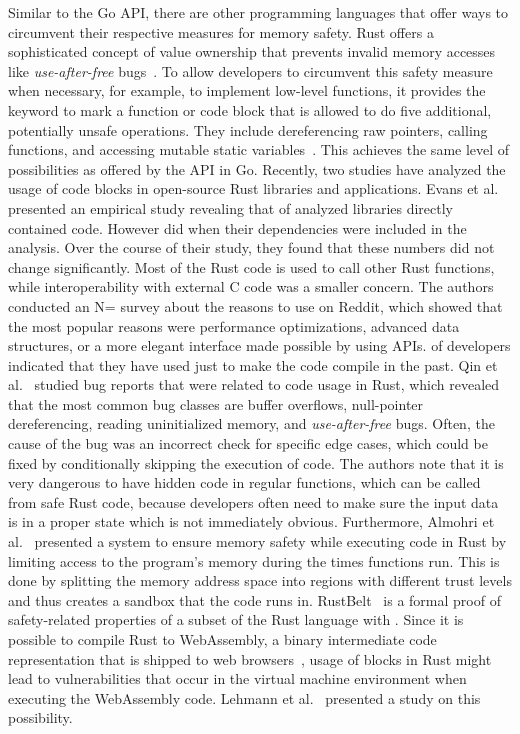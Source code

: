 Similar to the Go \unsafe{} \acrshort{API}, there are other programming languages that offer ways to circumvent their
respective measures for memory safety.
Rust offers a sophisticated concept of value ownership that prevents invalid memory accesses like
\textit{use-after-free} bugs~\cite{matsakis2014}.
To allow developers to circumvent this safety measure when necessary, for example, to implement low-level functions, it
provides the \unsafe{} keyword to mark a function or code block that is allowed to do five additional, potentially
unsafe operations.
They include dereferencing raw pointers, calling \unsafe{} functions, and accessing mutable static
variables~\cite{matsakis2014}.
This achieves the same level of possibilities as offered by the \unsafe{} \acrshort{API} in Go.
Recently, two studies have analyzed the usage of \unsafe{} code blocks in open-source Rust libraries and applications.
Evans et al.~\cite{evans2020} presented an empirical study revealing that  of analyzed
libraries directly contained \unsafe{} code.
However  did when their dependencies were included in the analysis.
Over the course of their  study, they found that these numbers did not change significantly.
Most of the \unsafe{} Rust code is used to call other Rust functions, while interoperability with external C code was a
smaller concern.
The authors conducted an N= survey about the reasons to use \unsafe{} on Reddit, which showed that the most
popular reasons were performance optimizations, advanced data structures, or a more elegant interface made possible by
using \unsafe{} \acrshort{API}s.
 of developers indicated that they have used \unsafe{} just to make the code compile in the past.
Qin et al.~\cite{qin2020} studied bug reports that were related to \unsafe{} code usage in Rust, which revealed that the
most common bug classes are buffer overflows, null-pointer dereferencing, reading uninitialized memory, and
\textit{use-after-free} bugs.
Often, the cause of the bug was an incorrect check for specific edge cases, which could be fixed by conditionally
skipping the execution of \unsafe{} code.
The authors note that it is very dangerous to have hidden \unsafe{} code in regular functions, which can be called from
safe Rust code, because developers often need to make sure the input data is in a proper state which is not immediately
obvious.
Furthermore, Almohri et al.~\cite{almohri2018} presented a system to ensure memory safety while executing \unsafe{} code
in Rust by limiting access to the program's memory during the times \unsafe{} functions run.
This is done by splitting the memory address space into regions with different trust levels and thus creates a sandbox
that the \unsafe{} code runs in.
RustBelt~\cite{jung2017} is a formal proof of safety-related properties of a subset of the Rust language with \unsafe{}.
Since it is possible to compile Rust to WebAssembly, a binary intermediate code representation that is shipped to web
browsers~\cite{rourke2018}, usage of \unsafe{} blocks in Rust might lead to vulnerabilities that occur in the virtual
machine environment when executing the WebAssembly code.
Lehmann et al.~\cite{lehmann2020} presented a study on this possibility.

